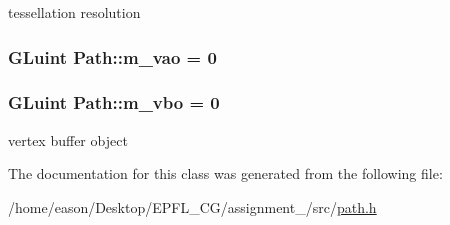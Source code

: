 tessellation resolution 

\subsubsection[{\texorpdfstring{m\+\_\+vao}{m_vao}}]{\setlength{\rightskip}{0pt plus 5cm}G\+Luint Path\+::m\+\_\+vao = 0\hspace{0.3cm}{\ttfamily [private]}}\hypertarget{classPath_a87bc63df1b698ec710bcd60c79100b63}{}\label{classPath_a87bc63df1b698ec710bcd60c79100b63}
\subsubsection[{\texorpdfstring{m\+\_\+vbo}{m_vbo}}]{\setlength{\rightskip}{0pt plus 5cm}G\+Luint Path\+::m\+\_\+vbo = 0\hspace{0.3cm}{\ttfamily [private]}}\hypertarget{classPath_a238310356ba1339fdb9ac19c85853e13}{}\label{classPath_a238310356ba1339fdb9ac19c85853e13}


vertex buffer object 



The documentation for this class was generated from the following file\+:\begin{DoxyCompactItemize}
\item 
/home/eason/\+Desktop/\+E\+P\+F\+L\+\_\+\+C\+G/assignment\+\_/src/\hyperlink{path_8h}{path.\+h}\end{DoxyCompactItemize}
